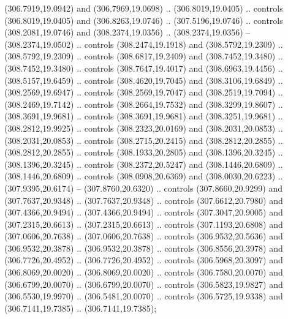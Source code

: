 (306.7919,19.0942) and (306.7969,19.0698) .. (306.8019,19.0405) .. controls (306.8019,19.0405) and (306.8263,19.0746) .. (307.5196,19.0746) .. controls (308.2081,19.0746) and (308.2374,19.0356) .. (308.2374,19.0356) -- (308.2374,19.0502) .. controls (308.2474,19.1918) and (308.5792,19.2309) .. (308.5792,19.2309) .. controls (308.6817,19.2409) and (308.7452,19.3480) .. (308.7452,19.3480) .. controls (308.7647,19.4017) and (308.6963,19.4456) .. (308.5157,19.6459) .. controls (308.4620,19.7045) and (308.3106,19.6849) .. (308.2569,19.6947) .. controls (308.2569,19.7047) and (308.2519,19.7094) .. (308.2469,19.7142) .. controls (308.2664,19.7532) and (308.3299,19.8607) .. (308.3691,19.9681) .. controls (308.3691,19.9681) and (308.3251,19.9681) .. (308.2812,19.9925) .. controls (308.2323,20.0169) and (308.2031,20.0853) .. (308.2031,20.0853) .. controls (308.2715,20.2415) and (308.2812,20.2855) .. (308.2812,20.2855) .. controls (308.1933,20.2805) and (308.1396,20.3245) .. (308.1396,20.3245) .. controls (308.2372,20.5247) and (308.1446,20.6809) .. (308.1446,20.6809) .. controls (308.0908,20.6369) and (308.0030,20.6223) .. (307.9395,20.6174) -- (307.8760,20.6320) .. controls (307.8660,20.9299) and (307.7637,20.9348) .. (307.7637,20.9348) .. controls (307.6612,20.7980) and (307.4366,20.9494) .. (307.4366,20.9494) .. controls (307.3047,20.9005) and (307.2315,20.6613) .. (307.2315,20.6613) .. controls (307.1193,20.6808) and (307.0606,20.7638) .. (307.0606,20.7638) .. controls (306.9532,20.5636) and (306.9532,20.3878) .. (306.9532,20.3878) .. controls (306.8556,20.3978) and (306.7726,20.4952) .. (306.7726,20.4952) .. controls (306.5968,20.3097) and (306.8069,20.0020) .. (306.8069,20.0020) .. controls (306.7580,20.0070) and (306.6799,20.0070) .. (306.6799,20.0070) .. controls (306.5823,19.9827) and (306.5530,19.9970) .. (306.5481,20.0070) .. controls (306.5725,19.9338) and (306.7141,19.7385) .. (306.7141,19.7385);
